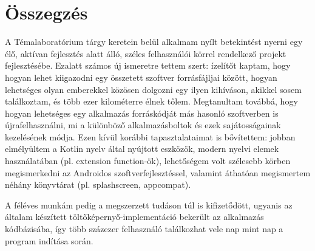 \chapter{Összegzés}

A Témalaboratórium tárgy keretein belül alkalmam nyílt betekintést nyerni egy élő,
aktívan fejlesztés alatt álló, széles felhasználói körrel rendelkező projekt fejlesztésébe.
Ezalatt számos új ismeretre tettem szert: ízelítőt kaptam, hogy hogyan lehet kiigazodni egy
összetett szoftver forrásfájljai között, hogyan lehetséges olyan emberekkel közösen dolgozni
egy ilyen kihíváson, akikkel sosem találkoztam, és több ezer kilométerre élnek tőlem.
Megtanultam továbbá, hogy hogyan lehetséges egy alkalmazás forráskódját más hasonló
szoftverben is újrafelhasználni, mi a különböző alkalmazásboltok és ezek sajátosságainak
kezelésének módja. Ezen kívül korábbi tapasztalataimat is bővítettem: jobban elmélyültem
a Kotlin nyelv által nyújtott eszközök, modern nyelvi elemek használatában
(pl. extension function-ök), lehetőségem volt szélesebb körben megismerkedni az Androidos
szoftverfejlesztéssel, valamint áthatóan megismertem néhány könyvtárat
(pl. \gls{splashscreen}, \gls{appcompat}).

A féléves munkám pedig a megszerzett tudáson túl is kifizetődött, ugyanis az általam
készített töltőképernyő-implementáció bekerült az alkalmazás kódbázisába, így több
százezer felhasználó találkozhat vele nap mint nap a program indítása során.
